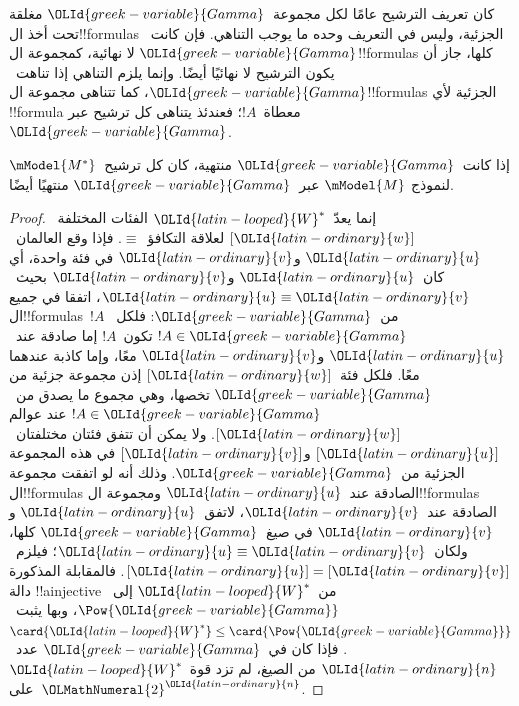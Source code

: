 \documentclass[../../../include/open-logic-section]{subfiles}
\begin{document}


كان تعريف الترشيح عامًا لكل مجموعة~$\OLId{greek-variable}{Gamma}$ مغلقة تحت أخذ ال!!{formula}s
الجزئية، وليس في التعريف وحده ما يوجب التناهي. فإن كانت~$\OLId{greek-variable}{Gamma}$
لا نهائية، كمجموعة ال!!{formula}s كلها، جاز أن يكون الترشيح لا نهائيًا
أيضًا. وإنما يلزم التناهي إذا تناهت~$\OLId{greek-variable}{Gamma}$، كما تتناهى مجموعة
ال!!{formula}s الجزئية لأي !!{formula} معطاة~$!A$؛ فعندئذ يتناهى كل
ترشيح عبر~$\OLId{greek-variable}{Gamma}$.

\begin{prop}
  إذا كانت~$\OLId{greek-variable}{Gamma}$ منتهية، كان كل ترشيح~$\mModel{M^*}$ لنموذج
  $\mModel{M}$ عبر~$\OLId{greek-variable}{Gamma}$ منتهيًا أيضًا.
\end{prop}

\begin{proof}
  إنما يعدّ~$\OLId{latin-looped}{W}^*$ الفئات المختلفة~$[\OLId{latin-ordinary}{w}]$ لعلاقة التكافؤ~$\equiv$.
  فإذا وقع العالمان~$\OLId{latin-ordinary}{u}$ و$\OLId{latin-ordinary}{v}$ في فئة واحدة، أي كان~$\OLId{latin-ordinary}{u}$ و$\OLId{latin-ordinary}{v}$
  بحيث~$\OLId{latin-ordinary}{u} \equiv \OLId{latin-ordinary}{v}$، اتفقا في جميع ال!!{formula}s~$!A$ من~$\OLId{greek-variable}{Gamma}$:
  فلكل~$!A \in \OLId{greek-variable}{Gamma}$ تكون~$!A$ إما صادقة عند~$\OLId{latin-ordinary}{u}$ و$\OLId{latin-ordinary}{v}$ معًا،
  وإما كاذبة عندهما معًا. فلكل فئة~$[\OLId{latin-ordinary}{w}]$ إذن مجموعة جزئية من
  $\OLId{greek-variable}{Gamma}$ تخصها، وهي مجموع ما يصدق من~$!A \in \OLId{greek-variable}{Gamma}$ عند عوالم
  $[\OLId{latin-ordinary}{w}]$. ولا يمكن أن تتفق فئتان مختلفتان~$[\OLId{latin-ordinary}{u}]$ و$[\OLId{latin-ordinary}{v}]$ في هذه المجموعة
  الجزئية من~$\OLId{greek-variable}{Gamma}$. وذلك أنه لو اتفقت مجموعة ال!!{formula}s الصادقة
  عند~$\OLId{latin-ordinary}{u}$ ومجموعة ال!!{formula}s الصادقة عند~$\OLId{latin-ordinary}{v}$، لاتفق~$\OLId{latin-ordinary}{u}$ و$\OLId{latin-ordinary}{v}$
  في صيغ~$\OLId{greek-variable}{Gamma}$ كلها، ولكان~$\OLId{latin-ordinary}{u} \equiv \OLId{latin-ordinary}{v}$؛ فيلزم~$[\OLId{latin-ordinary}{u}]=[\OLId{latin-ordinary}{v}]$.
  فالمقابلة المذكورة دالة !!a{injective} من~$\OLId{latin-looped}{W}^*$ إلى~$\Pow{\OLId{greek-variable}{Gamma}}$،
  وبها يثبت~$\card{\OLId{latin-looped}{W}^*} \le \card{\Pow{\OLId{greek-variable}{Gamma}}}$. فإذا كان في~$\OLId{greek-variable}{Gamma}$
  عدد~$\OLId{latin-ordinary}{n}$ من الصيغ، لم تزد قوة~$\OLId{latin-looped}{W}^*$ على~$\OLMathNumeral{2}^\OLId{latin-ordinary}{n}$.
\end{proof}
\end{document}
